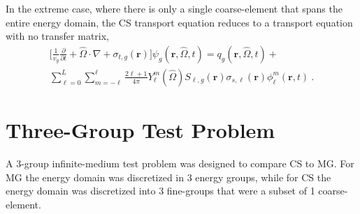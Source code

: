 \documentclass{anstrans}
\renewcommand{\vec}[1]{\bm{#1}} %
\begin{document}
In the extreme case, where there is only a single coarse-element that spans the entire energy domain, the CS transport equation reduces to a transport equation with no transfer matrix,
\begin{multline*}
\label{Eq.CS_extreme}
\Bigg[\frac{1}{v_g} \frac{\partial}{\partial t} + \hat{\Omega} \cdot \nabla + \sigma_{t,g}(\vec{r}) \Bigg] \psi_g(\vec{r},\hat{\Omega},t)  = q_g(\vec{r},\hat{\Omega},t) + \\ \sum_{\ell=0}^L \sum_{m=-\ell}^\ell \frac{2 \ell + 1}{4 \pi} Y_\ell^m(\hat{\Omega}) S_{\ell,g}(\vec{r}) \sigma_{s,\ell}(\vec{r}) \phi_{\ell}^m(\vec{r},t) \: .
\end{multline*}


\section{Three-Group Test Problem}
A 3-group infinite-medium test problem was designed to compare CS to MG. For MG the energy domain was discretized in 3 energy groups, while for CS the energy domain was discretized into 3 fine-groups that were a subset of 1 coarse-element. 
\end{document}
